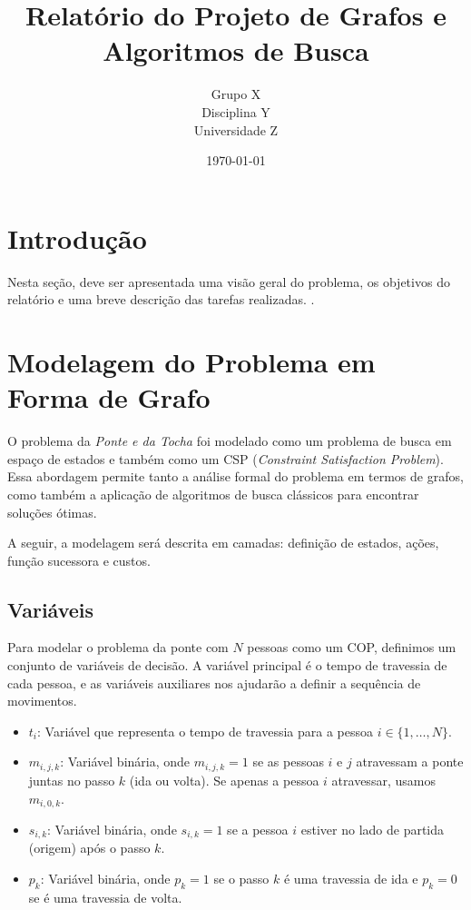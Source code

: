 \documentclass[12pt,a4paper]{article}
\title{Relatório do Projeto de Grafos e Algoritmos de Busca}
\author{Grupo X \\ Disciplina Y \\ Universidade Z}
\date{\today}
\begin{document}
\maketitle
\tableofcontents
\newpage

\section{Introdução}
Nesta seção, deve ser apresentada uma visão geral do problema, os objetivos do relatório e uma breve descrição das tarefas realizadas. 
\cite{cormen}.

\section{Modelagem do Problema em Forma de Grafo}
O problema da \textit{Ponte e da Tocha} foi modelado como um problema de busca em espaço de estados e também como um CSP (\textit{Constraint Satisfaction Problem}). Essa abordagem permite tanto a análise formal do problema em termos de grafos, como também a aplicação de algoritmos de busca clássicos para encontrar soluções ótimas. 

A seguir, a modelagem será descrita em camadas: definição de estados, ações, função sucessora e custos.

\subsection*{Variáveis}

Para modelar o problema da ponte com $N$ pessoas como um COP, definimos um conjunto de variáveis de decisão. A variável principal é o tempo de travessia de cada pessoa, e as variáveis auxiliares nos ajudarão a definir a sequência de movimentos.

\begin{itemize}
    \item $t_i$: Variável que representa o tempo de travessia para a pessoa $i \in \{1, \dots, N\}$.
    \item $m_{i,j,k}$: Variável binária, onde $m_{i,j,k} = 1$ se as pessoas $i$ e $j$ atravessam a ponte juntas no passo $k$ (ida ou volta). Se apenas a pessoa $i$ atravessar, usamos $m_{i,0,k}$.
    \item $s_{i,k}$: Variável binária, onde $s_{i,k} = 1$ se a pessoa $i$ estiver no lado de partida (origem) após o passo $k$.
    \item $p_k$: Variável binária, onde $p_k=1$ se o passo $k$ é uma travessia de ida e $p_k=0$ se é uma travessia de volta.
\end{itemize}
\end{document}
